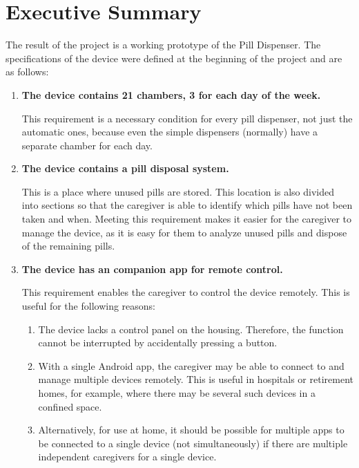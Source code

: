 \section*{Executive Summary}
The result of the project is a working prototype of the Pill Dispenser. The specifications of the device were defined at the beginning of the project and are as follows:
\begin{enumerate}
\item{\textbf{The device contains 21 chambers, 3 for each day of the week.}} 

This requirement is a necessary condition for every pill dispenser, not just the automatic ones, because even the simple dispensers (normally) have a separate chamber for each day.
\item{\textbf{The device contains a pill disposal system.}}

 This is a place where unused pills are stored. This location is also divided into sections so that the caregiver is able to identify which pills have not been taken and when. Meeting this requirement makes it easier for the caregiver to manage the device, as it is easy for them to analyze unused pills and dispose of the remaining pills.
 
\item{\textbf{The device has an companion app for remote control.}} 

This requirement enables the caregiver to control the device remotely. This is useful for the following reasons:

\begin{enumerate}
	\item The device lacks a control panel on the housing. Therefore, the function cannot be interrupted by accidentally pressing a button.
	\item With a single Android app, the caregiver may be able to connect to and manage multiple devices remotely. This is useful in hospitals or retirement homes, for example, where there may be several such devices in a confined space.
	\item Alternatively, for use at home, it should be possible for multiple apps to be connected to a single device (not simultaneously) if there are multiple independent caregivers for a single device.
\end{enumerate}
\end{enumerate}

